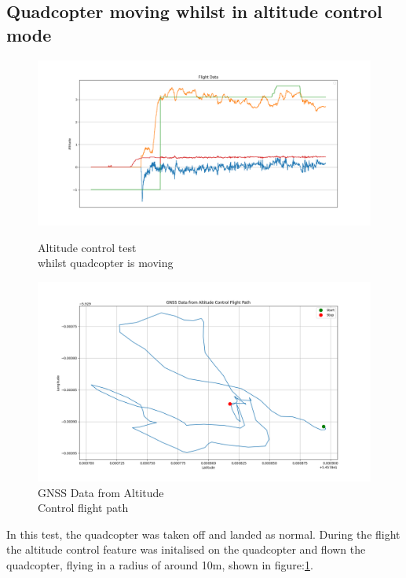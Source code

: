 \documentclass{article}
\begin{document}
\subsection*{Quadcopter moving whilst in altitude control mode}
\begin{figure}[H]
  \begin{minipage}{0.5\textwidth}
    \centering
    \includegraphics[width=1\textwidth]{Pictures/Altitude_hold_test_moving.png}
    \captionsetup{justification=centering}
    \caption{Altitude control test \\ whilst quadcopter is moving}
    \label{fig:Altitude_hold_test_moving}
  \end{minipage}
  \begin{minipage}{0.5\textwidth}
    \centering
    \includegraphics[width=1\textwidth]{Pictures/GNSS_Altitude_hold_test_moving.png}
    \captionsetup{justification=centering}
    \caption{GNSS Data from Altitude \\ Control flight path}
    \label{fig:GNSS_Altitude_hold_test_moving}
  \end{minipage}
\end{figure}
In this test, the quadcopter was taken off and landed as normal. During the flight the altitude control feature was initalised on the quadcopter and flown the quadcopter, flying in a radius of around 10m, shown in figure:\ref{fig:GNSS_Altitude_hold_test_moving}.
\end{document}
